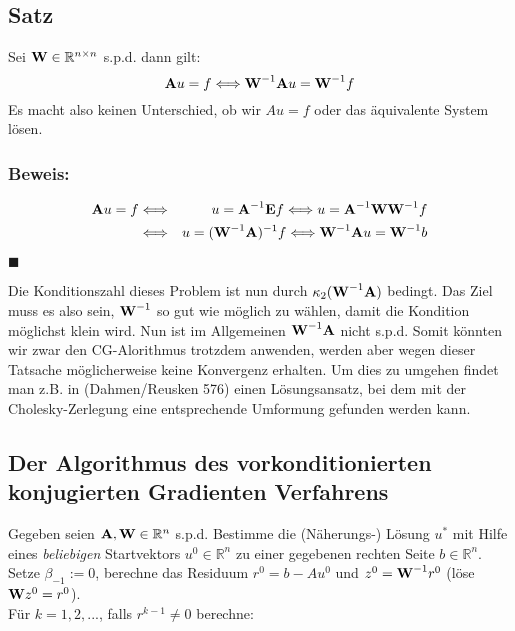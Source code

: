 \subsection{Satz}

Sei ${\textbf{W}} \in \mathbb{R}^{n \times n}$ s.p.d. dann gilt:
\begin{equation}
{\textbf{A}}u = f \Longleftrightarrow {\textbf{W}}^{-1} {\textbf{A}} u = {\textbf{W}}^{-1} f
\end{equation}
Es macht also keinen Unterschied, ob wir $Au = f$ oder das äquivalente System lösen.

\subsubsection{Beweis:}

\begin{eqnarray}
{\textbf{A}}u = f &\Longleftrightarrow& u = {\textbf{A}}^{-1} {\textbf{E}} f \Longleftrightarrow u = {\textbf{A}}^{-1} {\textbf{W}} {\textbf{W}}^{-1} f \notag \\
&\Longleftrightarrow& u = ({\textbf{W}}^{-1} {\textbf{A}})^{-1} f \Longleftrightarrow {\textbf{W}}^{-1} {\textbf{A}} u = {\textbf{W}}^{-1} b \notag
\end{eqnarray}
\begin{flushright}
$\blacksquare$
\end{flushright}

Die Konditionszahl dieses Problem ist nun durch $\kappa_{2}({\textbf{W}}^{-1}{\textbf{A}})$ bedingt. Das Ziel muss es also sein, ${\textbf{W}}^{-1}$ so gut wie möglich zu wählen, damit die Kondition möglichst klein wird. Nun ist im Allgemeinen ${\textbf{W}}^{-1}{\textbf{A}}$ nicht s.p.d. Somit könnten wir zwar den CG-Alorithmus trotzdem anwenden, werden aber wegen dieser Tatsache möglicherweise keine Konvergenz erhalten. Um dies zu umgehen findet man z.B. in (Dahmen/Reusken 576) einen Lösungsansatz, bei dem mit der Cholesky-Zerlegung eine entsprechende Umformung gefunden werden kann.

\subsection{Der Algorithmus des vorkonditionierten konjugierten Gradienten Verfahrens}\label{ss.Algorithmus PCG}

Gegeben seien ${\textbf{A}}, {\textbf{W}} \in \mathbb{R}^{n}$ s.p.d. Bestimme die (Näherungs-) Lösung $u^{*}$ mit Hilfe eines \textit{beliebigen} Startvektors $u^{0} \in \mathbb{R}^{n}$ zu einer gegebenen rechten Seite $b \in \mathbb{R}^{n}$. Setze $\beta_{-1} := 0$, berechne das Residuum $r^{0} = b - Au^{0}$ und $z^{0} = {\textbf{W}}^{-1}r^{0}$ (löse ${\textbf{W}}z^{0} = r^{0}$).\\
Für $k = 1,2,...$, falls $r^{k-1} \ne 0$ berechne:

